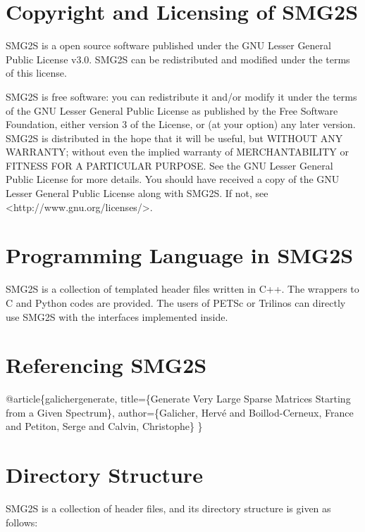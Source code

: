 \documentclass[a4paper, 10 pt]{report}
\begin{document}
	\section{Copyright and Licensing of SMG2S}
	
	SMG2S is a open source software published under the GNU Lesser General Public License v3.0. SMG2S can be redistributed and modified under the terms of this license.
	
	SMG2S is free software: you can redistribute it and/or modify
	it under the terms of the GNU Lesser General Public License as published
	by the Free Software Foundation, either version 3 of the License, or
	(at your option) any later version.
	SMG2S is distributed in the hope that it will be useful,
	but WITHOUT ANY WARRANTY; without even the implied warranty of
	MERCHANTABILITY or FITNESS FOR A PARTICULAR PURPOSE.  See the
	GNU Lesser General Public License for more details.
	You should have received a copy of the GNU Lesser General Public License
	along with SMG2S.  If not, see <http://www.gnu.org/licenses/>.
	
	\section{Programming Language in SMG2S}
	SMG2S is a collection of templated header files written in C++. The wrappers to C and Python codes are provided. The users of PETSc or Trilinos can  directly use SMG2S with the interfaces implemented inside.
	
	\section{Referencing SMG2S}
	
	@article\{galichergenerate, title=\{Generate Very Large Sparse Matrices Starting from a Given Spectrum\},  author=\{Galicher, Herv{\'e} and Boillod-Cerneux, France and Petiton, Serge and Calvin, Christophe\}
	\}
	\section{Directory Structure}
	
	SMG2S is a collection of header files, and its directory structure is given as follows:
	
\end{document}

